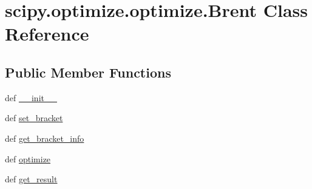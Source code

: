 \hypertarget{classscipy_1_1optimize_1_1optimize_1_1Brent}{}\section{scipy.\+optimize.\+optimize.\+Brent Class Reference}
\label{classscipy_1_1optimize_1_1optimize_1_1Brent}
\subsection*{Public Member Functions}
\begin{DoxyCompactItemize}
\item 
def \hyperlink{classscipy_1_1optimize_1_1optimize_1_1Brent_a5e0071bedd1188c15f0516125e0d60be}{\+\_\+\+\_\+init\+\_\+\+\_\+}
\item 
def \hyperlink{classscipy_1_1optimize_1_1optimize_1_1Brent_a3f06ddf05233672ebe9ed50a26cf8a27}{set\+\_\+bracket}
\item 
def \hyperlink{classscipy_1_1optimize_1_1optimize_1_1Brent_acf91cc7bb08dd0ee48d326b80d42af26}{get\+\_\+bracket\+\_\+info}
\item 
def \hyperlink{classscipy_1_1optimize_1_1optimize_1_1Brent_abd2fdbc5046503036d4e2dcc343e6680}{optimize}
\item 
def \hyperlink{classscipy_1_1optimize_1_1optimize_1_1Brent_abf16ae089d34d6079ac66c9727b51168}{get\+\_\+result}
\end{DoxyCompactItemize}
